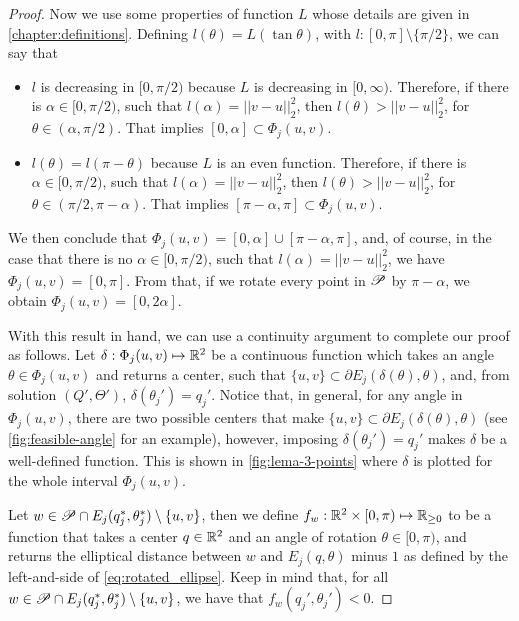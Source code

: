 \begin{proof}
	Now we use some properties of function $L$ whose details are given in \autoref{chapter:definitions}.
	Defining $l(\theta)=L(\tan{\theta})$, with $l:[0, \pi]\setminus\{\pi/2\}$, we can say that
	
	\begin{itemize}
		\item $l$ is decreasing in $[0, \pi/2)$ because $L$ is decreasing in $[0, \infty)$. Therefore, if there is $\alpha\in[0, \pi/2)$, such that $l(\alpha) = ||v-u||_2^2$, then $l(\theta)>||v-u||_2^2$, for $\theta\in(\alpha, \pi/2)$. That implies $[0, \alpha] \subset \Phi_j(u,v)$.
		\item $l(\theta) = l(\pi-\theta)$ because $L$ is an even function. Therefore, if there is $\alpha\in[0, \pi/2)$, such that $l(\alpha) = ||v-u||_2^2$, then $l(\theta)>||v-u||_2^2$, for $\theta\in(\pi/2,\pi-\alpha)$. That implies $[\pi-\alpha, \pi] \subset \Phi_j(u,v)$.
	\end{itemize}
	We then conclude that $\Phi_j(u, v) = [0, \alpha]\cup [\pi-\alpha, \pi]$, and, of course, in the case that there is no $\alpha\in[0, \pi/2)$, such that $l(\alpha)=||v-u||_2^2$, we have $\Phi_j(u,v)=[0, \pi]$.
	From that, if we rotate every point in $\mathscr{P}$ by $\pi-\alpha$, we obtain $\Phi_j(u,v)=[0, 2\alpha]$.
	
	With this result in hand, we can use a continuity argument to complete our proof as follows.
	Let $\delta : \Phi_j(u,v) \mapsto \mathbb{R}^2$ be a continuous function which takes an angle $\theta\in\Phi_j(u,v)$ and returns a center, such that $\{u,v\} \subset \partial E_j(\delta(\theta), \theta)$, and, from solution $(Q', \Theta')$, $\delta(\theta_j') = q_j'$. Notice that, in general, for any angle in $\Phi_j(u,v)$, there are two possible centers that make $\{u,v\} \subset \partial E_j(\delta(\theta), \theta)$ (see \autoref{fig:feasible-angle} for an example), however, imposing $\delta(\theta_j') = q_j'$ makes $\delta$ be a well-defined function. This is shown in \autoref{fig:lema-3-points} where $\delta$ is plotted for the whole interval $\Phi_j(u,v)$.
	
	Let $w\in \mathscr{P} \cap E_j(q_j^*, \theta_j^*) \setminus \{u,v\}$, then we define $f_w  : \mathbb{R}^2 \times [0, \pi) \mapsto \mathbb{R}_{\ge0}$ to be a function that takes a center $q \in \mathbb{R}^2$ and an angle of rotation $\theta\in [0, \pi)$, and returns the elliptical distance between $w$ and $E_j(q, \theta)$ minus $1$ as defined by the left-and-side of \autoref{eq:rotated_ellipse}. Keep in mind that, for all $w\in \mathscr{P} \cap E_j(q_j^*, \theta_j^*)\setminus \{u,v\}$, we have that $f_w(q_j', \theta_j') < 0$.
	

\end{proof}
